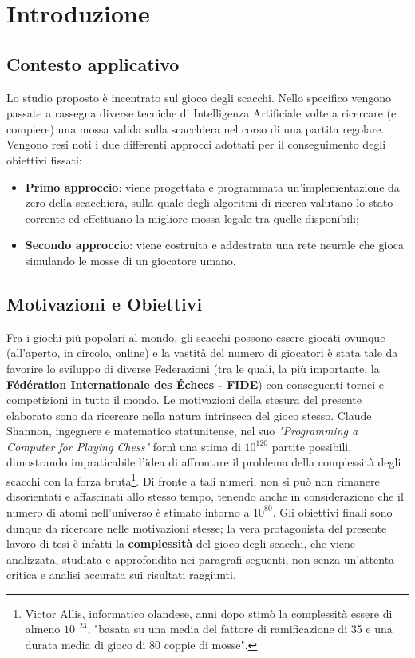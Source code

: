 \chapter{Introduzione}
\label{cap: introduzione}
\section{Contesto applicativo}
\label{cap: contesto_applicativo}
Lo studio proposto è incentrato sul gioco degli scacchi. Nello specifico vengono passate a rassegna diverse tecniche di 
Intelligenza Artificiale volte a ricercare (e compiere) una mossa valida sulla scacchiera nel corso di una partita regolare.
Vengono resi noti i due differenti approcci adottati per il conseguimento degli obiettivi fissati: 
\begin{itemize}
    \item \textbf{Primo approccio}: viene progettata e programmata un'implementazione da zero della scacchiera, sulla quale degli algoritmi di ricerca valutano lo stato corrente ed effettuano la migliore mossa legale tra quelle disponibili;
    \item \textbf{Secondo approccio}: viene costruita e addestrata una rete neurale che gioca simulando le mosse di un giocatore umano. 
\end{itemize}

\section{Motivazioni e Obiettivi} %
Fra i giochi più popolari al mondo, gli scacchi possono essere giocati ovunque (all'aperto, in circolo, online) e la vastità del numero di 
giocatori è stata tale da favorire lo sviluppo di diverse Federazioni (tra le quali, la più importante, la 
\textbf{Fédération Internationale des Échecs - FIDE}) con conseguenti tornei e competizioni in tutto il mondo. 
Le motivazioni della stesura del presente elaborato sono da ricercare nella natura intrinseca del gioco stesso. 
Claude Shannon, ingegnere e matematico statunitense, nel suo \textit{"Programming a Computer for Playing Chess"} fornì una stima di $10^{120}$
partite possibili, dimostrando impraticabile l'idea di affrontare il problema della complessità degli scacchi con la forza bruta\footnote{Victor Allis, informatico olandese, 
anni dopo stimò la complessità essere di almeno $10^{123}$, "basata su una media del fattore di ramificazione di 35 e una 
durata media di gioco di 80 coppie di mosse".}. Di fronte a tali numeri, non si può non rimanere disorientati e affascinati allo
stesso tempo, tenendo anche in considerazione che il numero di atomi nell'universo è stimato intorno a $10^{80}$\cite{itwiki:119558224}. 
Gli obiettivi finali sono dunque da ricercare nelle motivazioni stesse; la vera protagonista del
presente lavoro di tesi è infatti la \textbf{complessità} del gioco degli scacchi, che viene analizzata, studiata e approfondita nei paragrafi
seguenti, non senza un'attenta critica e analisi accurata sui risultati raggiunti.

